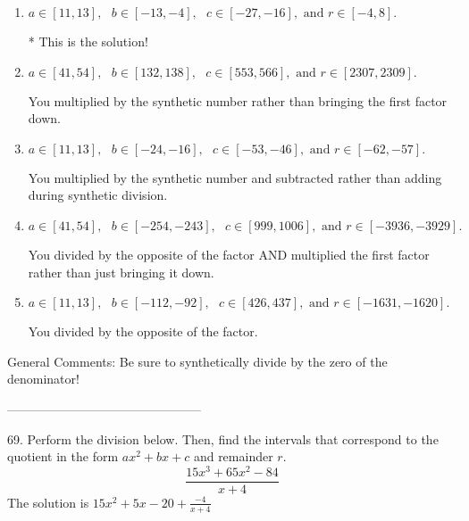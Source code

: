 \documentclass{extbook}[14pt]
\begin{document}
\begin{enumerate}[label=\Alph*.] 
\item $ a \in [11, 13], \text{   } b \in [-13, -4], \text{   } c \in [-27, -16], \text{   and   } r \in [-4, 8]. $ 

 * This is the solution! 
\item $ a \in [41, 54], \text{   } b \in [132, 138], \text{   } c \in [553, 566], \text{   and   } r \in [2307, 2309]. $ 

  You multiplied by the synthetic number rather than bringing the first factor down. 
\item $ a \in [11, 13], \text{   } b \in [-24, -16], \text{   } c \in [-53, -46], \text{   and   } r \in [-62, -57]. $ 

  You multiplied by the synthetic number and subtracted rather than adding during synthetic division. 
\item $ a \in [41, 54], \text{   } b \in [-254, -243], \text{   } c \in [999, 1006], \text{   and   } r \in [-3936, -3929]. $ 

  You divided by the opposite of the factor AND multiplied the first factor rather than just bringing it down. 
\item $ a \in [11, 13], \text{   } b \in [-112, -92], \text{   } c \in [426, 437], \text{   and   } r \in [-1631, -1620]. $ 

  You divided by the opposite of the factor. 
\end{enumerate} 
 
General Comments: Be sure to synthetically divide by the zero of the denominator!

-----------------------------------------------

69. Perform the division below. Then, find the intervals that correspond to the quotient in the form $ax^2+bx+c$ and remainder $r$.
\[ \frac{15x^{3} +65 x^{2} -84}{x + 4} \] 
The solution is $ 15x^{2} +5 x -20 + \frac{-4}{x + 4} $ 
\end{document}
